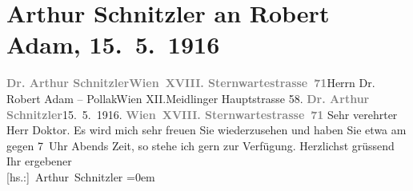 

         
         \renewcommand{\erwaehntePersonen}{Personen: Robert Adam}
         \renewcommand{\erwaehnteOrte}{Orte: IX., Alsergrund, Meidlinger Hauptstraße, Sternwartestraße, Wien, XII., Meidling}
         \renewcommand{\erwaehnteWerke}{}
               \section[Arthur Schnitzler an Robert Adam, 15. 5. 1916]{ Arthur Schnitzler an Robert Adam, 15. 5. 1916}\nopagebreak{}\rehead{ }\begin{ledgroupsized}[t]{13cm}\normalsize\beginnumbering \toendnotes[C]{\smallbreak\pagebreak[2]} 
\toendnotes[C]{\smallbreak}\pstart{}{\pb}\textcolor{gray}{\textbf{Dr. Arthur Schnitzler}}\pend{}\pstart{}\textcolor{gray}{\textbf{Wien XVIII. Sternwartestrasse 71}}\pend{}{\bigskip}\pstart{}{\pb}Herrn Dr. Robert Adam – Pollak\pend{}\pstart{}Wien XII.\pend{}\pstart{}Meidlinger Hauptstrasse 58.\pend{}{\bigskip}\pstart
           \noindent{}{\pb}\textcolor{gray}{\textbf{Dr. Arthur Schnitzler}}\hfill 15. 5. 1916.\pend
           \pstart
           \textcolor{gray}{\textbf{Wien XVIII. Sternwartestrasse 71}}\pend
           \pstart\center{}Sehr verehrter Herr Doktor.\pend\pstart
           Es wird mich sehr freuen Sie wiederzusehen und haben Sie etwa am \label{K_L02227-1v}\label{K_L02227-1h} gegen 7 Uhr Abends Zeit, so stehe ich gern zur Verfügung.\pend
           \pstart
           Herzlichst grüssend{\\[\baselineskip]}Ihr ergebener{\\[\baselineskip]}\spacefill\mbox{{[}hs.:{]} Arthur Schnitzler}\pend
           \leftskip=0em{}
         
         \endnumbering{}\end{ledgroupsized}  \newcommand{\dateiname}{L02227}\newcommand{\titel}{Arthur Schnitzler an Robert Adam, 15. 5. 1916}\newcommand{\editorInnen}{Martin Anton Müller und Gerd-Hermann Susen}
      